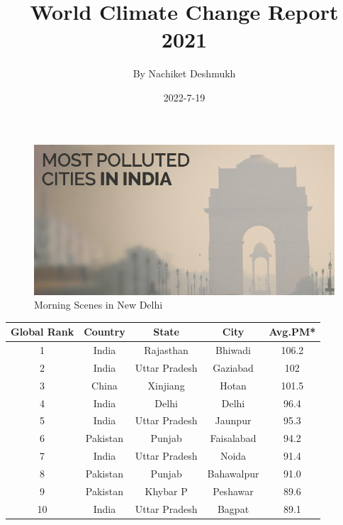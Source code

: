 \documentclass{article}
\title{\huge\textbf{World Climate Change Report 2021}}
\date{\huge 2022-7-19}
\author{\huge By Nachiket Deshmukh}
\begin{document}
\maketitle
{}
\newpage
{}

\begin{figure}
\includegraphics[width=\linewidth]{polluted_cities.jpg}
\caption{Morning Scenes in New Delhi}
\label{fig 1:Morning Scenes in New Delhi }
\end{figure}

\begin{table}[h!]
	\begin{center}
		\begin{tabular}{||c | c | c | c | c||}
		\hline
		Global Rank & Country & State & City & Avg.PM* \\
		\hline\hline
		1 & India & Rajasthan & Bhiwadi & 106.2\\ \hline
		2 & India &  Uttar Pradesh & Gaziabad & 102\\ \hline
		3 & China & Xinjiang & Hotan & 101.5\\ \hline
		4 & India & Delhi & Delhi & 96.4 \\ \hline
		5 & India & Uttar Pradesh & Jaunpur & 95.3\\ \hline
		6 & Pakistan & Punjab & Faisalabad & 94.2\\ \hline
		7 & India & Uttar Pradesh & Noida & 91.4\\ \hline
		8 & Pakistan & Punjab & Bahawalpur & 91.0\\ \hline
		9 & Pakistan & Khybar P & Peshawar & 89.6\\ \hline
		10 & India & Uttar Pradesh & Bagpat & 89.1\\ \hline
	
		
		 
		
\end{tabular}			
		
		
	\end{center}
\end{table}
\end{document}
